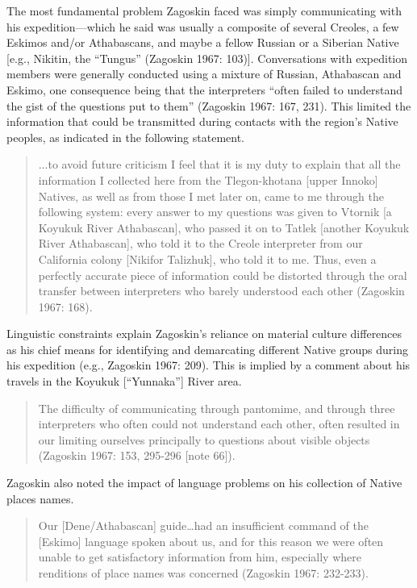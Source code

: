 The most fundamental problem Zagoskin faced was simply communicating with his expedition—which he said was usually a composite of several Creoles, a few Eskimos and/or Athabascans, and maybe a fellow Russian or a Siberian Native [e.g., Nikitin, the “Tungus” (Zagoskin 1967: 103)].  Conversations with expedition members were generally conducted using a mixture of Russian, Athabascan and Eskimo, one consequence being that the interpreters “often failed to understand the gist of the questions put to them” (Zagoskin 1967: 167, 231).  This limited the information that could be transmitted during contacts with the region’s Native peoples, as indicated in the following statement.

\begin{quote}
    ...to avoid future criticism I feel that it is my duty to explain that all the information I collected here from the Tlegon-khotana [upper Innoko] Natives, as well as from those I met later on, came to me through the following system: every answer to my questions was given to Vtornik [a Koyukuk River Athabascan], who passed it on to Tatlek [another Koyukuk River Athabascan], who told it to the Creole interpreter from our California colony [Nikifor Talizhuk], who told it to me.  Thus, even a perfectly accurate piece of information could be distorted through the oral transfer between interpreters who barely understood each other (Zagoskin 1967: 168).

\end{quote}

Linguistic constraints explain Zagoskin’s reliance on material culture differences as his chief means for identifying and demarcating different Native groups during his expedition (e.g., Zagoskin 1967: 209). This is implied by a comment about his travels in the Koyukuk [“Yunnaka”] River area.

\begin{quote}
The difficulty of communicating through pantomime, and through three interpreters who often could not understand each other, often resulted in our limiting ourselves principally to questions about visible objects (Zagoskin 1967: 153, 295-296 [note 66]).
\end{quote}

\noindent
Zagoskin also noted the impact of language problems on his collection of Native places names.

\begin{quote}
    Our [Dene/Athabascan] guide…had an insufficient command of the [Eskimo] language spoken about us, and for this reason we were often unable to get satisfactory information from him, especially where renditions of place names was concerned (Zagoskin 1967: 232-233).

\end{quote}

